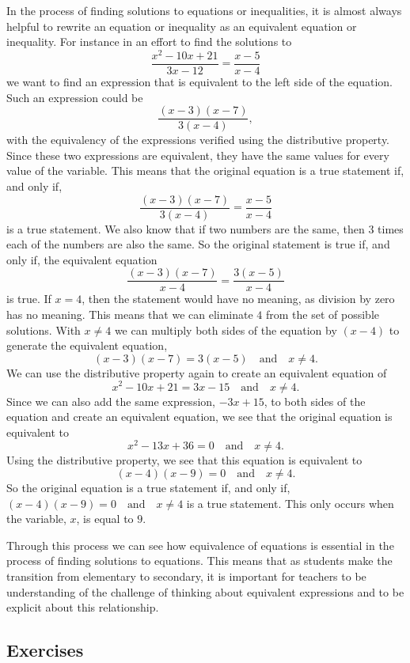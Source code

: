 \documentclass[
]{book}
\theoremstyle{definition}
\theoremstyle{definition}
\theoremstyle{definition}
\theoremstyle{definition}
\theoremstyle{remark}
\begin{document}
In the process of finding solutions to equations or inequalities, it is almost always helpful to rewrite an equation or inequality as an equivalent equation or inequality. For instance in an effort to find the solutions to \[\frac{x^2-10x+21}{3x-12} = \frac{x-5}{x-4}\]
we want to find an expression that is equivalent to the left side of the equation. Such an expression could be \[\frac{(x-3)(x-7)}{3(x-4)},\] with the equivalency of the expressions verified using the distributive property. Since these two expressions are equivalent, they have the same values for every value of the variable. This means that the original equation is a true statement if, and only if, \[\frac{(x-3)(x-7)}{3(x-4)}=\frac{x-5}{x-4}\] is a true statement. We also know that if two numbers are the same, then \(3\) times each of the numbers are also the same. So the original statement is true if, and only if, the equivalent equation
\[\frac{(x-3)(x-7)}{x-4}=\frac{3(x-5)}{x-4}\] is true. If \(x=4\), then the statement would have no meaning, as division by zero has no meaning. This means that we can eliminate \(4\) from the set of possible solutions. With \(x\neq 4\) we can multiply both sides of the equation by \((x-4)\) to generate the equivalent equation, \[(x-3)(x-7)=3(x-5) \quad \mbox{and} \quad x\neq 4.\] We can use the distributive property again to create an equivalent equation of \[x^2-10x+21=3x-15 \quad \mbox{and} \quad x\neq 4.\] Since we can also add the same expression, \(-3x+15\), to both sides of the equation and create an equivalent equation, we see that the original equation is equivalent to \[x^2-13x+36=0 \quad \mbox{and} \quad x\neq 4.\] Using the distributive property, we see that this equation is equivalent to \[(x-4)(x-9)=0 \quad \mbox{and} \quad x\neq 4.\] So the original equation is a true statement if, and only if, \((x-4)(x-9)=0 \quad \mbox{and} \quad x\neq 4\) is a true statement. This only occurs when the variable, \(x\), is equal to \(9\).

Through this process we can see how equivalence of equations is essential in the process of finding solutions to equations. This means that as students make the transition from elementary to secondary, it is important for teachers to be understanding of the challenge of thinking about equivalent expressions and to be explicit about this relationship.

\hypertarget{exercises-8}{%
\subsection{Exercises}\label{exercises-8}}
\end{document}
